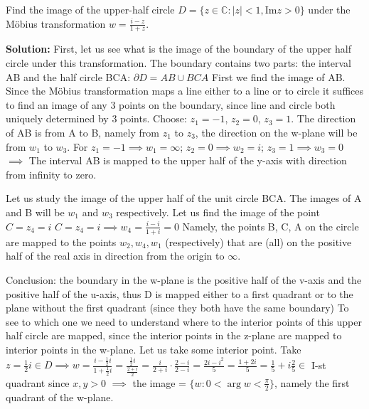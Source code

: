 \documentclass[12pt]{article}
\newcommand{\Ima}{\text{Im}}
\begin{document}
\begin{example}
Find the image of the upper-half circle $D = \{z \in \mathbb{C}: |z| < 1, \Ima z > 0\}$ under the Möbius transformation $w = \frac{i-z}{1+z}$.

\textbf{Solution:} First, let us see what is the image of the boundary of the upper half circle under this transformation.
The boundary contains two parts: the interval AB and the half circle BCA: $\partial D = AB \cup BCA$
First we find the image of AB.
Since the Möbius transformation maps a line either to a line or to circle it suffices to find an image of any 3 points on the boundary, since line and circle both uniquely determined by 3 points. Choose: $z_1 = -1$, $z_2 = 0$, $z_3 = 1$.
The direction of AB is from A to B, namely from $z_1$ to $z_3$, the direction on the w-plane will be from $w_1$ to $w_3$.
For $z_1 = -1 \implies w_1 = \infty$; $z_2 = 0 \implies w_2 = i$; $z_3 = 1 \implies w_3 = 0$
$\implies$ The interval AB is mapped to the upper half of the y-axis with direction from infinity to zero.

Let us study the image of the upper half of the unit circle BCA. The images of A and B will be $w_1$ and $w_3$ respectively. Let us find the image of the point $C = z_4 = i$
$C = z_4 = i \implies w_4 = \frac{i-i}{1+i} = 0$
Namely, the points B, C, A on the circle are mapped to the points $w_2, w_4, w_1$ (respectively) that are (all) on the positive half of the real axis in direction from the origin to $\infty$.

Conclusion: the boundary in the w-plane is the positive half of the v-axis and the positive half of the u-axis, thus D is mapped either to a first quadrant or to the plane without the first quadrant (since they both have the same boundary) To see to which one we need to understand where to the interior points of this upper half circle are mapped, since the interior points in the z-plane are mapped to interior points in the w-plane. Let us take some interior point.
Take $z = \frac{1}{2}i \in D \implies w = \frac{i-\frac{1}{2}i}{1+\frac{1}{2}i} = \frac{\frac{1}{2}i}{\frac{2+i}{2}} = \frac{i}{2+i}\cdot\frac{2-i}{2-i} = \frac{2i-i^2}{5} = \frac{1+2i}{5} = \frac{1}{5} + i\frac{2}{5} \in$ I-st quadrant since $x,y > 0$
$\implies$ the image = $\{w: 0 < \arg w < \frac{\pi}{2}\}$, namely the first quadrant of the w-plane.
\end{example}
\end{document}

